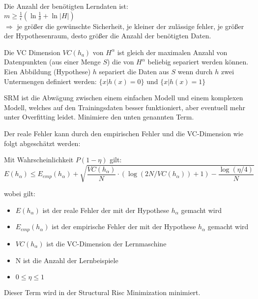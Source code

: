 Die Anzahl der benötigten Lerndaten ist: \\
$m \geq \frac{1}{\epsilon}(\ln\frac{1}{\delta}+\ln|H|)$ \\
$\Rightarrow$ je größer die gewünschte Sicherheit, je kleiner der zulässige fehler, je größer
der Hypothesenraum, desto größer die Anzahl der benötigten Daten.

Die VC Dimension $VC(h_a)$ von $H^\alpha$ ist gleich der maximalen Anzahl von Datenpunkten
(aus einer Menge $S$) die von $H^\alpha$ beliebig separiert werden können.
Eien Abbildung (Hypothese) $h$ separiert die Daten aus $S$ wenn durch $h$ zwei Untermengen
definiert werden:
$\{x|h(x) = 0\} \text{ und } \{x|h(x) = 1\}$

SRM ist die Abwägung zwischen einem einfachen Modell und einem komplexen Modell,
welches auf den Trainingsdaten besser funktioniert, aber eventuell mehr unter
Overfitting leidet.
Minimiere den unten genannten Term.

Der reale Fehler kann durch den empirischen Fehler und die VC-Dimension wie
folgt abgeschätzt werden:

Mit Wahrscheinlichkeit $P(1-\eta)$ gilt:
\begin{displaymath}
        E(h_\alpha) \leq E_{emp}(h_\alpha) + \sqrt{\frac{VC(h_\alpha)}{N} \cdot (\log(2 N / VC(h_\alpha)) + 1) - \frac{\log(\eta  / 4)}{N}}
\end{displaymath}


wobei gilt:

\begin{itemize}
    \item $E(h_\alpha)$ ist der reale Fehler der mit der Hypothese $h_\alpha$
        gemacht wird
    \item $E_{emp}(h_\alpha)$ ist der empirische Fehler der mit der Hypothese $h_\alpha$
        gemacht wird
    \item $VC(h_\alpha)$ ist die VC-Dimension der Lernmaschine
    \item N ist die Anzahl der Lernbeispiele
    \item $0 \leq \eta \leq 1$
\end{itemize}
Dieser Term wird in der Structural Risc Minimization minimiert.
